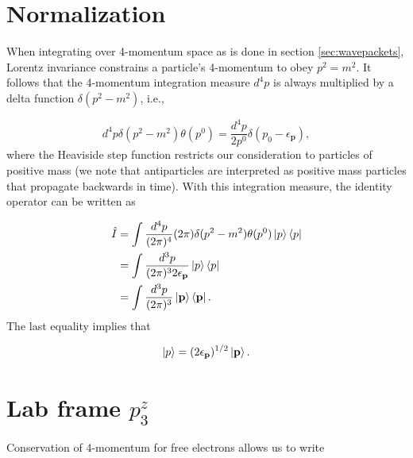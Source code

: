 \documentclass{article}
\begin{document}
\pagebreak
\section{Normalization}
\label{app:normalization}

When integrating over 4-momentum space as is done in section
\ref{sec:wavepackets}, Lorentz invariance constrains a particle's 4-momentum to
obey $p^2 = m^2$.
It follows that the 4-momentum integration measure $d^4p$ is always multiplied
by a delta function $\delta(p^2-m^2)$, i.e.,

\begin{equation}
    d^4p\delta(p^2 - m^2)\theta(p^0)
    =
    \frac{d^4p}{2p^0}\delta(p_0 - \epsilon_\mathbf{p}),
\end{equation}
%
where the Heaviside step function restricts our consideration to particles of
positive mass (we note that antiparticles are interpreted as positive mass
particles that propagate backwards in time).  With this integration measure,
the identity operator can be written as

\begin{equation}
\label{eq:identity}
\begin{aligned}
    \hat{I}
    &=
    \int \frac{d^4p}{(2\pi)^4}(2\pi)\delta(p^2 - m^2)\theta(p^0)
    \ket{p}\bra{p}
    \\&=
    \int \frac{d^3p}{(2\pi)^3 2\epsilon_\mathbf{p}}
    \ket{p}\bra{p}
    \\&=
    \int \frac{d^3p}{(2\pi)^3}
    \ket{\mathbf{p}}\bra{\mathbf{p}}.
\end{aligned}
\end{equation}
%
The last equality implies that

\begin{equation}
\label{eq:normalization}
    \ket{p} = (2\epsilon_\mathbf{p})^{1/2}\ket{\mathbf{p}}.
\end{equation}


\pagebreak
\section{Lab frame $p^z_3$}
\label{app:p3z}

Conservation of 4-momentum for free electrons allows us to write
\end{document}
